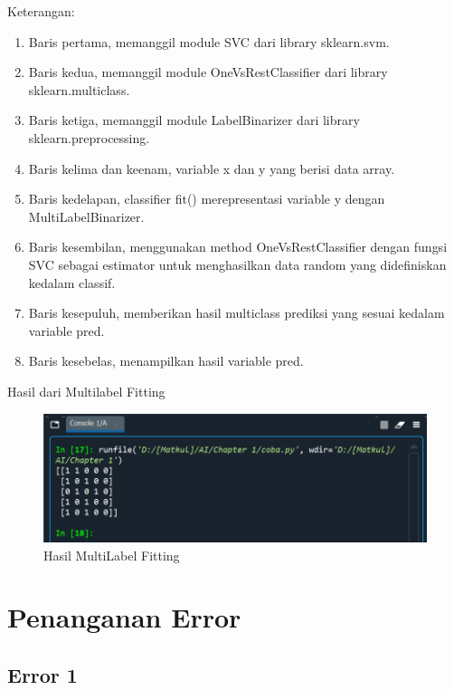 \par Keterangan:
    \begin{enumerate}
        \item Baris pertama, memanggil module SVC dari library sklearn.svm.
        \item Baris kedua, memanggil module OneVsRestClassifier dari library sklearn.multiclass.
        \item Baris ketiga, memanggil module LabelBinarizer dari library sklearn.preprocessing.
        \item Baris kelima dan keenam, variable x dan y yang berisi data array.
        \item Baris kedelapan, classifier fit() merepresentasi variable y dengan MultiLabelBinarizer.
        \item Baris kesembilan, menggunakan method OneVsRestClassifier dengan fungsi SVC sebagai estimator untuk menghasilkan data random yang didefiniskan kedalam classif.
        \item Baris kesepuluh, memberikan hasil multiclass prediksi yang sesuai kedalam variable pred.
        \item Baris kesebelas, menampilkan hasil variable pred. 
    \end{enumerate}

\par Hasil dari Multilabel Fitting

    \begin{figure}[H]
    \centering
    \includegraphics[width=13cm]{figures/1184023/31.PNG}
    \caption{Hasil MultiLabel Fitting}
    \end{figure}

\section{Penanganan Error}

\subsection{Error 1}

